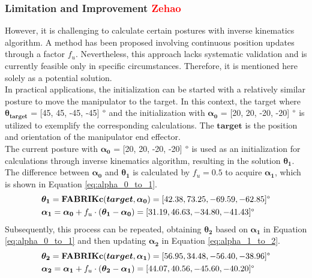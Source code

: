 \subsubsection{Limitation and Improvement \textcolor{red}{Zehao}}
However, it is challenging to calculate certain postures with inverse kinematics algorithm. A method has 
been proposed involving continuous position updates through a factor $f_u$. Nevertheless, this approach 
lacks systematic validation and is currently feasible only in specific circumstances. Therefore, it is 
mentioned here solely as a potential solution. \\
In practical applications, the initialization can be started with a relatively similar posture 
to move the manipulator to the target. In this context, the target where $\boldsymbol{\theta_{target}}$ = 
[45, 45, -45, -45] $\degree$ and the initialization with $\boldsymbol{\alpha_0}$ = [20, 20, -20, -20] $\degree$ 
is utilized to exemplify the corresponding calculations. The $\boldsymbol{target}$ is the position and 
orientation of the manipulator end effector. \\
The current posture with $\boldsymbol{\alpha_0}$  = [20, 20, -20, -20] $\degree$ is used as an initialization 
for calculations through inverse kinematics algorithm, resulting in the solution $\boldsymbol{\theta_1}$. 
The difference between $\boldsymbol{\alpha_0}$ and $\boldsymbol{\theta_1}$ is calculated by $f_u = 0.5$ to acquire 
$\boldsymbol{\alpha_1}$, which is shown in Equation \ref{eq:alpha_0_to_1}.
\begin{align}
    &\boldsymbol{\theta_1} = \textbf{FABRIKc}(\boldsymbol{target}, \boldsymbol{\alpha_0}) 
    = [42.38, 73.25, -69.59, -62.85]\degree \nonumber \\
    &\boldsymbol{\alpha_1} = \boldsymbol{\alpha_0} + f_u \cdot (\boldsymbol{\theta_1} - \boldsymbol{\alpha_0}) 
    = [31.19, 46.63, -34.80, -41.43]\degree
    \label{eq:alpha_0_to_1}
\end{align}
Subsequently, this process can be repeated, obtaining $\boldsymbol{\theta_2}$ based on $\boldsymbol{\alpha_1}$ in 
Equation \ref{eq:alpha_0_to_1} and then updating $\boldsymbol{\alpha_2}$ in Equation \ref{eq:alpha_1_to_2}.
\begin{align}
    &\boldsymbol{\theta_2} = \textbf{FABRIKc}(\boldsymbol{target}, \boldsymbol{\alpha_1}) 
    = [56.95, 34.48, -56.40, -38.96]\degree \nonumber \\
    &\boldsymbol{\alpha_2} = \boldsymbol{\alpha_1} + f_u \cdot (\boldsymbol{\theta_2} - \boldsymbol{\alpha_1}) 
    = [44.07, 40.56, -45.60, -40.20]\degree
    \label{eq:alpha_1_to_2}
\end{align}
